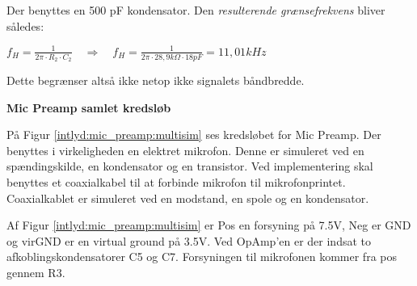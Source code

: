 Der benyttes en 500 pF kondensator. Den \textit{resulterende grænsefrekvens} bliver således:
\begin{center}
${ f }_{ H }=\frac { 1 }{ 2\pi \cdot { R }_{ 2 }\cdot { C }_{ 2 } } \quad \Longrightarrow \quad { f }_{ H }=\frac { 1 }{ 2\pi \cdot 28,9k\Omega \cdot 18pF } =11,01kHz$
\end{center}

Dette begrænser altså ikke netop ikke signalets båndbredde.

\textbf{Mic Preamp samlet kredsløb}

På Figur \ref{intlyd:mic_preamp:multisim} ses kredsløbet for Mic Preamp. Der benyttes i virkeligheden en elektret mikrofon. Denne er simuleret ved en spændingskilde, en kondensator og en transistor. Ved implementering skal benyttes et coaxialkabel til at forbinde mikrofon til mikrofonprintet. Coaxialkablet er simuleret ved en modstand, en spole og en kondensator. 


Af Figur \ref{intlyd:mic_preamp:multisim} er Pos en forsyning på 7.5V, Neg er GND og virGND er en virtual ground på 3.5V. Ved OpAmp'en er der indsat to afkoblingskondensatorer C5 og C7. 
Forsyningen til mikrofonen kommer fra pos gennem R3. 


